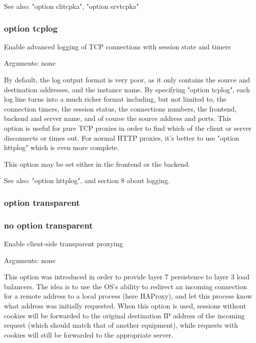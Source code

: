   See also: "option clitcpka", "option srvtcpka"

\subsubsection{option tcplog}


  Enable advanced logging of TCP connections with session state and timers


  Arguments: none

  By default, the log output format is very poor, as it only contains the
  source and destination addresses, and the instance name. By specifying
  "option tcplog", each log line turns into a much richer format including, but
  not limited to, the connection timers, the session status, the connections
  numbers, the frontend, backend and server name, and of course the source
  address and ports. This option is useful for pure TCP proxies in order to
  find which of the client or server disconnects or times out. For normal HTTP
  proxies, it's better to use "option httplog" which is even more complete.

  This option may be set either in the frontend or the backend.

  See also: "option httplog", and section 8 about logging.

\subsubsection{option transparent}
\subsubsection{no option transparent}


  Enable client-side transparent proxying


  Arguments: none

  This option was introduced in order to provide layer 7 persistence to layer 3
  load balancers. The idea is to use the OS's ability to redirect an incoming
  connection for a remote address to a local process (here HAProxy), and let
  this process know what address was initially requested. When this option is
  used, sessions without cookies will be forwarded to the original destination
  IP address of the incoming request (which should match that of another
  equipment), while requests with cookies will still be forwarded to the
  appropriate server.

